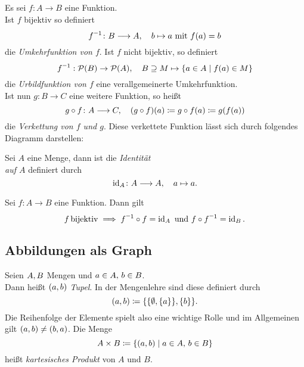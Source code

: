 \documentclass[../ana1.tex]{subfiles}
\begin{document}
\begin{defi*}
	Es sei \(f \colon A \longrightarrow B \) eine Funktion. \\
	Ist \(f \) bijektiv so definiert
	\[\inverse{f} \colon B \longrightarrow A \ko \quad b \mapsto a \text{ mit } f(a) = b \]
	die \textit{Umkehrfunktion von \(f \)}.
	Ist \(f \) nicht bijektiv, so definiert
	\[ \abb{\inverse{f}}{\PO(B)}{\PO(A)} \ko \quad B \supseteq M \mapsto \set{a \in A \; \vert \; f(a) \in M} \]
	die \textit{Urbildfunktion von \(f \)} eine verallgemeinerte Umkehrfunktion. \\
	Ist nun \(g \colon B \longrightarrow C \) eine weitere Funktion, so heißt
	\[g \circ f \colon A \longrightarrow C , \quad (g \circ f)(a) \coloneqq g \circ f(a) \coloneqq g(f(a)) \]
	die \textit{Verkettung von \(f \) und \(g \)}. Diese verkettete Funktion lässt sich durch folgendes Diagramm darstellen:
	\begin{center}
	\end{center}
\end{defi*}

\begin{defi*}[Identitätsabbildung]
	Sei \(A \) eine Menge, dann ist die \textit{Identität} \\
	\textit{auf \(A \)} definiert durch
	\[\operatorname{id}_{A} \colon A \longrightarrow A , \quad a \mapsto a. \]
\end{defi*}


\begin{bem}
	Sei \(f \colon A \longrightarrow B \) eine Funktion. Dann gilt
	\[f \bijektiv \implies \inverse{f} \circ f = \id_{A} \text{ und } f \circ \inverse{f} = \id_{B}. \]
\end{bem}


\subsection{Abbildungen als Graph}

\begin{defi}
	Seien \(A , B \) Mengen und \(a \in A , \, b \in B \). \\
	Dann heißt \((a , b) \) \textit{Tupel}.
	In der Mengenlehre sind diese definiert durch 
	\[(a , b) \coloneqq \{ \{\emptyset , \{a\}\}, \{b\} \}. \]
	Die Reihenfolge der Elemente spielt also eine wichtige Rolle und im Allgemeinen gilt \((a , b) \neq (b , a) \).
	Die Menge
	\[A \times B \coloneqq \{(a , b) \; \vert \; a \in A , \, b \in B\} \]
	heißt \textit{kartesisches Produkt} von \(A \) und \(B \).
\end{defi}
\end{document}
